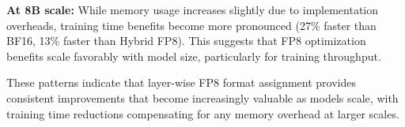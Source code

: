 \textbf{At 8B scale:} While memory usage increases slightly due to implementation overheads, training time benefits become more pronounced (27\% faster than BF16, 13\% faster than Hybrid FP8). This suggests that FP8 optimization benefits scale favorably with model size, particularly for training throughput.

These patterns indicate that layer-wise FP8 format assignment provides consistent improvements that become increasingly valuable as models scale, with training time reductions compensating for any memory overhead at larger scales.